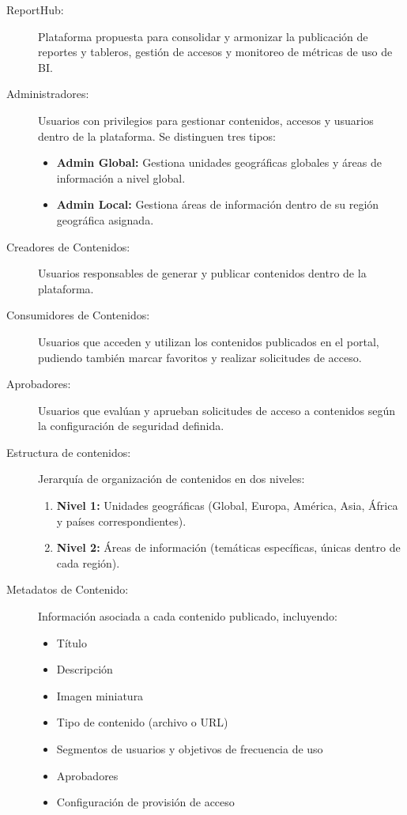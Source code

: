 \begin{description}

\item[ReportHub:] Plataforma propuesta para consolidar y armonizar la publicación de reportes y tableros, gestión de accesos y monitoreo de métricas de uso de BI.

\item[Administradores:] Usuarios con privilegios para gestionar contenidos, accesos y usuarios dentro de la plataforma. Se distinguen tres tipos:
    \begin{itemize}
        \item \textbf{Admin Global:} Gestiona unidades geográficas globales y áreas de información a nivel global.
        \item \textbf{Admin Local:} Gestiona áreas de información dentro de su región geográfica asignada.
    \end{itemize}

\item[Creadores de Contenidos:] Usuarios responsables de generar y publicar contenidos dentro de la plataforma.

\item[Consumidores de Contenidos:] Usuarios que acceden y utilizan los contenidos publicados en el portal, pudiendo también marcar favoritos y realizar solicitudes de acceso.

\item[Aprobadores:] Usuarios que evalúan y aprueban solicitudes de acceso a contenidos según la configuración de seguridad definida.

\item[Estructura de contenidos:] Jerarquía de organización de contenidos en dos niveles:
    \begin{enumerate}
        \item \textbf{Nivel 1:} Unidades geográficas (Global, Europa, América, Asia, África y países correspondientes).
        \item \textbf{Nivel 2:} Áreas de información (temáticas específicas, únicas dentro de cada región).
    \end{enumerate}

\item[Metadatos de Contenido:] Información asociada a cada contenido publicado, incluyendo:
    \begin{itemize}
        \item Título
        \item Descripción
        \item Imagen miniatura
        \item Tipo de contenido (archivo o URL)
        \item Segmentos de usuarios y objetivos de frecuencia de uso
        \item Aprobadores
        \item Configuración de provisión de acceso
    \end{itemize}

\end{description}

